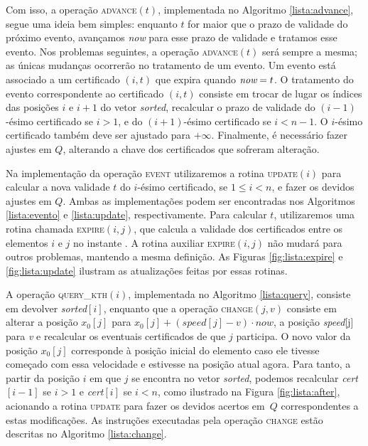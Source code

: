 Com isso, a operação \textsc{advance}$(t)$, implementada no
Algoritmo \ref{lista:advance}, segue uma ideia bem simples: enquanto
$t$ for maior que o prazo de validade do próximo evento, avançamos
\textit{now} para esse prazo de validade e tratamos esse evento. Nos
problemas seguintes, a operação \textsc{advance}$(t)$ será sempre a
mesma; as únicas mudanças ocorrerão no tratamento de um evento. Um
evento está associado a um certificado $(i, t)$ que expira quando
$\textit{now} = t$. O tratamento do evento correspondente ao certificado
$(i, t)$ consiste em trocar de lugar os índices das posições $i$ e
$i + 1$ do vetor \textit{sorted}, recalcular o prazo de validade do
$(i-1)$-ésimo certificado se $i > 1$, e do $(i + 1)$-ésimo
certificado se $i < n - 1$. O $i$-ésimo certificado também deve ser
ajustado para $+\infty$. Finalmente, é necessário fazer ajustes em
$Q$, alterando a chave dos certificados que sofreram alteração.



Na implementação da operação \textsc{event} utilizaremos a rotina
\textsc{update}$(i)$ para calcular a nova validade $t$ do $i$-ésimo
certificado, se $1 \leq i < n$, e fazer os devidos ajustes em $Q$.
Ambas as implementações podem ser encontradas nos Algoritmos
\ref{lista:evento} e \ref{lista:update}, respectivamente. Para
calcular $t$, utilizaremos uma rotina chamada \textsc{expire}$(i,
j)$, que calcula a validade dos certificados entre os elementos $i$
e $j$ no instante \now. A rotina auxiliar \textsc{expire}$(i, j)$
não mudará para outros problemas, mantendo a mesma definição. As
Figuras \ref{fig:lista:expire} e \ref{fig:lista:update} ilustram as
atualizações feitas por essas rotinas.













A operação \textsc{query\_kth}$(i)$, implementada no Algoritmo
\ref{lista:query}, consiste em devolver \textit{sorted}$[i]$,
enquanto que a operação \textsc{change}$(j, v)$ consiste em alterar
a posição $x_0[j]$ para $x_0[j] + (\mathit{speed}[j] - v)\cdot now$,
a posição \textit{speed}[j] para \textit{v} e recalcular os
eventuais certificados de que $j$ participa. O novo valor da posição
$x_0[j]$ corresponde à posição inicial do elemento caso ele tivesse
começado com essa velocidade e estivesse na posição atual agora.
Para tanto, a partir da posição $i$ em que $j$ se encontra no vetor
\textit{sorted}, podemos recalcular \textit{cert}$[i - 1]$ se $i >
1$ e \textit{cert}$[i]$ se $i < n$, como ilustrado na Figura
\ref{fig:lista:after}, acionando a rotina \textsc{update} para fazer
os devidos acertos em~$Q$ correspondentes a estas modificações. As
instruções executadas pela operação \textsc{change} estão descritas
no Algoritmo \ref{lista:change}.


